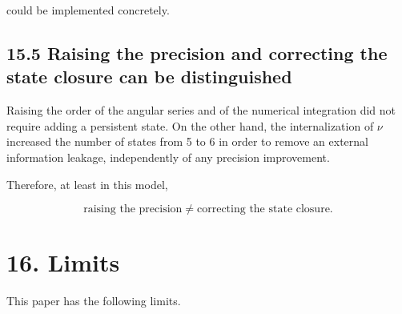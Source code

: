 \documentclass[
  a4paper,
]{article}
\begin{document}
could be implemented concretely.

\subsection{15.5 Raising the precision and correcting the state closure
can be
distinguished}\label{raising-the-precision-and-correcting-the-state-closure-can-be-distinguished}

Raising the order of the angular series and of the numerical integration
did not require adding a persistent state. On the other hand, the
internalization of \(\nu\) increased the number of states from 5 to 6 in
order to remove an external information leakage, independently of any
precision improvement.

Therefore, at least in this model,

\[
\boxed{
\text{raising the precision}
\neq
\text{correcting the state closure}.
}
\]

\section{16. Limits}\label{limits}

This paper has the following limits.
\end{document}
